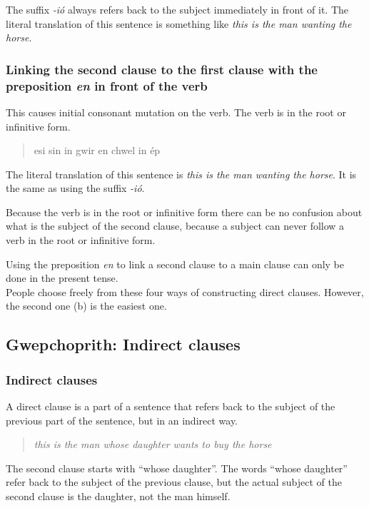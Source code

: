 The suffix \textit{-i\'{o}} always refers back to the subject immediately in front of it. The literal translation of this sentence is something like \textit{this is the man wanting the horse}.

\subsubsection{Linking the second clause to the first clause with the preposition \textit{en} in front of the verb}

This causes initial consonant mutation on the verb. The verb is in the root or infinitive form.


\begin{quote}
esi sin in gwir en chwel in \'{e}p
\end{quote}

The literal translation of this sentence is \textit{this is the man wanting the horse}. It is the same as using the suffix \textit{-i\'{o}}.

Because the verb is in the root or infinitive form there can be no confusion about what is the subject of the second clause, because a subject can never follow a verb in the root or infinitive form.

Using the preposition \textit{en} to link a second clause to a main clause can only be done in the present tense.\\
People choose freely from these four ways of constructing direct clauses. However, the second one (b) is the easiest one.

\subsection{Gwepchoprith: Indirect clauses}
\subsubsection{Indirect clauses}

A direct clause is a part of a sentence that refers back to the subject of the previous part of the sentence, but in an indirect way.

\begin{quote}
  \textit{this is the man whose daughter wants to buy the horse}
\end{quote}

The second clause starts with ``whose daughter''. The words ``whose daughter'' refer back to the subject of the previous clause, but the actual subject of the second clause is the daughter, not the man himself.

